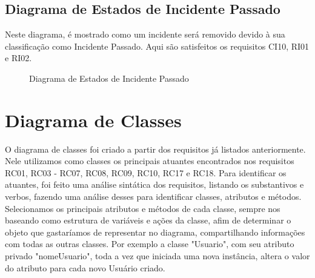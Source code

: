\documentclass[12pt]{article}
\begin{document}
\vfill%
\pagebreak%

\subsection{Diagrama de Estados de Incidente Passado}

Neste diagrama, é mostrado como um incidente será removido devido à sua classificação como Incidente Passado. Aqui são satisfeitos os requisitos CI10, RI01 e RI02.

  \begin{figure}[!htb]
    \caption{\label{fig:diagEstadoIncidentePassado} Diagrama de Estados de Incidente Passado}
  \end{figure}


\section{Diagrama de Classes} 

O diagrama de classes foi criado a partir dos requisitos já listados anteriormente. Nele utilizamos como classes os principais atuantes encontrados nos requisitos RC01, RC03 - RC07, RC08, RC09, RC10, RC17 e RC18. Para identificar os atuantes, foi feito uma análise sintática dos requisitos, listando os substantivos e verbos, fazendo uma análise desses para identificar classes, atributos e métodos. Selecionamos os principais atributos e métodos de cada classe, sempre nos baseando como estrutura de variáveis e ações da classe, afim de determinar o objeto que gastaríamos de representar no diagrama, compartilhando informações com todas as outras classes. Por exemplo a classe "Usuario", com seu atributo privado "nomeUsuario", toda a vez que iniciada uma nova instância, altera o valor do atributo para cada novo Usuário criado. 
\end{document}
